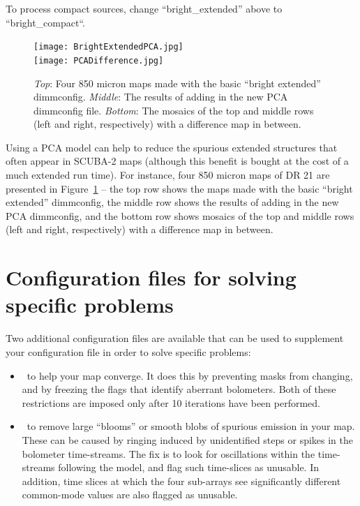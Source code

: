 To process compact sources, change “bright\_extended” above to “bright\_compact“.

\begin{figure}
\texttt{[image: BrightExtendedPCA.jpg]}\\
\texttt{[image: PCADifference.jpg]}
\caption[PCA dimmconfig results]
   {\textit{Top}: Four 850 micron maps made with the basic ``bright extended'' dimmconfig. \textit{Middle}: The results of adding in the new PCA dimmconfig file. \textit{Bottom}: The mosaics of the top and middle rows (left and right, respectively) with a difference map in between.}
   \label{fig:PCAfig}
\end{figure}

Using a PCA model can help to reduce the spurious extended structures that often appear in SCUBA-2 maps (although this benefit is bought at the cost of a much extended run time). For instance, four 850 micron maps of DR 21 are presented in Figure~\ref{fig:PCAfig} – the top row shows the maps made with the basic “bright extended” dimmconfig, the middle row shows the results of adding in the new PCA dimmconfig, and the bottom row shows mosaics of the top and middle rows (left and right, respectively) with a difference map in between.

\section{Configuration files for solving specific problems}
\label{sec:problem}

Two additional configuration files are available that can be used to supplement your
configuration file in order to solve specific problems:

\begin{itemize}[noitemsep]

\item \fixconvergence\ to help your map converge. It does this by preventing masks
from changing, and by freezing the flags that identify aberrant bolometers. Both of
these restrictions are imposed only after 10 iterations have been performed.

\item \fixblobs\ to remove large ``blooms'' or smooth blobs of spurious emission
in your map. These can be caused by ringing induced by unidentified steps or
spikes in the bolometer time-streams. The fix is to look for oscillations
within the time-streams following the  model, and flag such
time-slices as unusable.  In addition, time slices at which the four sub-arrays
see significantly different common-mode values are also flagged as unusable.

\end{itemize}

